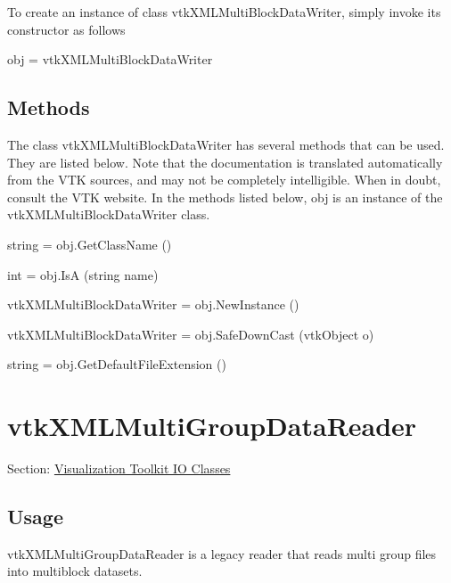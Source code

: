 To create an instance of class vtk\-X\-M\-L\-Multi\-Block\-Data\-Writer, simply invoke its constructor as follows \begin{DoxyVerb}  obj = vtkXMLMultiBlockDataWriter
\end{DoxyVerb}
 \hypertarget{vtkwidgets_vtkxyplotwidget_Methods}{}\subsection{Methods}\label{vtkwidgets_vtkxyplotwidget_Methods}
The class vtk\-X\-M\-L\-Multi\-Block\-Data\-Writer has several methods that can be used. They are listed below. Note that the documentation is translated automatically from the V\-T\-K sources, and may not be completely intelligible. When in doubt, consult the V\-T\-K website. In the methods listed below, {\ttfamily obj} is an instance of the vtk\-X\-M\-L\-Multi\-Block\-Data\-Writer class. 
\begin{DoxyItemize}
\item {\ttfamily string = obj.\-Get\-Class\-Name ()}  
\item {\ttfamily int = obj.\-Is\-A (string name)}  
\item {\ttfamily vtk\-X\-M\-L\-Multi\-Block\-Data\-Writer = obj.\-New\-Instance ()}  
\item {\ttfamily vtk\-X\-M\-L\-Multi\-Block\-Data\-Writer = obj.\-Safe\-Down\-Cast (vtk\-Object o)}  
\item {\ttfamily string = obj.\-Get\-Default\-File\-Extension ()}  
\end{DoxyItemize}\hypertarget{vtkio_vtkxmlmultigroupdatareader}{}\section{vtk\-X\-M\-L\-Multi\-Group\-Data\-Reader}\label{vtkio_vtkxmlmultigroupdatareader}
Section\-: \hyperlink{sec_vtkio}{Visualization Toolkit I\-O Classes} \hypertarget{vtkwidgets_vtkxyplotwidget_Usage}{}\subsection{Usage}\label{vtkwidgets_vtkxyplotwidget_Usage}
vtk\-X\-M\-L\-Multi\-Group\-Data\-Reader is a legacy reader that reads multi group files into multiblock datasets.

